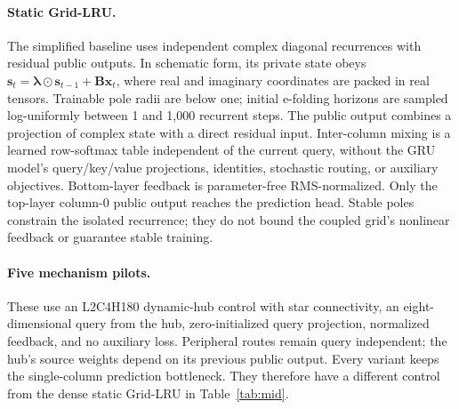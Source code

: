 \documentclass[letterpaper,twoside]{article}
\begin{document}
\paragraph{Static Grid-LRU.}
The simplified baseline uses independent complex diagonal recurrences with residual public outputs. In schematic form, its private state obeys $\mathbf{s}_t=\boldsymbol{\lambda}\odot\mathbf{s}_{t-1}+\mathbf{B}\mathbf{x}_t$, where real and imaginary coordinates are packed in real tensors. Trainable pole radii are below one; initial e-folding horizons are sampled log-uniformly between 1 and 1,000 recurrent steps. The public output combines a projection of complex state with a direct residual input. Inter-column mixing is a learned row-softmax table independent of the current query, without the GRU model's query/key/value projections, identities, stochastic routing, or auxiliary objectives. Bottom-layer feedback is parameter-free RMS-normalized. Only the top-layer column-0 public output reaches the prediction head. Stable poles constrain the isolated recurrence; they do not bound the coupled grid's nonlinear feedback or guarantee stable training.

\paragraph{Five mechanism pilots.}
These use an L2C4H180 dynamic-hub control with star connectivity, an eight-dimensional query from the hub, zero-initialized query projection, normalized feedback, and no auxiliary loss. Peripheral routes remain query independent; the hub's source weights depend on its previous public output. Every variant keeps the single-column prediction bottleneck. They therefore have a different control from the dense static Grid-LRU in Table~\ref{tab:mid}.
\end{document}
